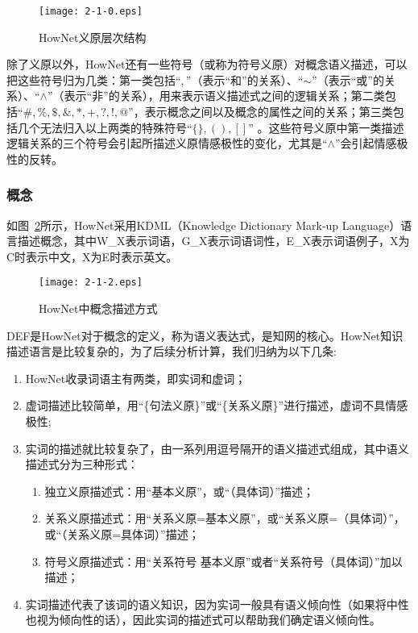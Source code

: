 \begin{figure}[htp]
\centering
\texttt{[image: 2-1-0.eps]}
\caption{HowNet义原层次结构}
\label{fig2-2}
\end{figure}

除了义原以外，HowNet还有一些符号（或称为符号义原）对概念语义描述，可以把这些符号归为几类：第一类包括“$ , $”（表示“和”的关系）、“$\sim $”（表示“或”的关系）、“$ \wedge$”（表示“非”的关系），用来表示语义描述式之间的逻辑关系；第二类包括“$\#, \%, \$, \& ,\ast,+,?,!,@ $”，表示概念之间以及概念的属性之间的关系；第三类包括几个无法归入以上两类的特殊符号“$\{\}, \left( \right), \left[ \right]$” 。这些符号义原中第一类描述逻辑关系的三个符号会引起所描述义原情感极性的变化，尤其是“$ \wedge$”会引起情感极性的反转。

\subsubsection{概念}
如图~\ref{fig2-3}所示，HowNet采用KDML（Knowledge Dictionary Mark-up Language）语言描述概念，其中W\_X表示词语，G\_X表示词语词性，E\_X表示词语例子，X为C时表示中文，X为E时表示英文。

\begin{figure}[htp]
\centering
\texttt{[image: 2-1-2.eps]}
\caption{HowNet中概念描述方式}
\label{fig2-3}
\end{figure}
DEF是HowNet对于概念的定义，称为语义表达式，是知网的核心。HowNet知识描述语言是比较复杂的，为了后续分析计算，我们归纳为以下几条:
\begin{enumerate}
\item HowNet收录词语主有两类，即实词和虚词；
\item 虚词描述比较简单，用“\{句法义原\}”或“\{关系义原\}”进行描述，虚词不具情感极性;
\item 实词的描述就比较复杂了，由一系列用逗号隔开的语义描述式组成，其中语义描述式分为三种形式：
     \begin{enumerate}
     \item 独立义原描述式：用“基本义原”，或“（具体词）”描述；
     \item 关系义原描述式：用“关系义原=基本义原”，或“关系义原=（具体词）”，或“（关系义原=具体词）”描述；
     \item 符号义原描述式：用“关系符号 基本义原”或者“关系符号（具体词）”加以描述；
     \end{enumerate}
\item 实词描述代表了该词的语义知识，因为实词一般具有语义倾向性（如果将中性也视为倾向性的话），因此实词的描述式可以帮助我们确定语义倾向性。
\end{enumerate}

